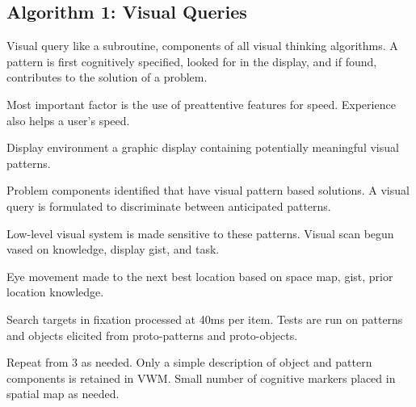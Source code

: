 \begin{mdframed}
\begin{multicols}{2}
\subsection{Algorithm 1: Visual Queries}
\begin{compactdesc}
\item[Visual query] like a subroutine, components of all visual thinking
    algorithms. A pattern is first cognitively specified, looked for in the
    display, and if found, contributes to the solution of a problem.
\item[Most important] factor is the use of preattentive features for speed.
    Experience also helps a user's speed.
\item[Display environment] a graphic display containing potentially meaningful
visual patterns.
\end{compactdesc}


\midrule\begin{compactenum}
\item Problem components identified that have visual pattern based solutions.
    A visual query is formulated to discriminate between anticipated patterns.
\item Low-level visual system is made sensitive to these patterns. Visual
    scan begun vased on knowledge, display gist, and task.
\item Eye movement made to the next best location based on space
    map, gist, prior location knowledge.
\item Search targets in fixation processed at 40ms per item. Tests are run on
    patterns and objects elicited from proto-patterns and proto-objects.
\item Repeat from 3 as needed. Only a simple description of object and
    pattern components is retained in VWM. Small number of cognitive markers
    placed in spatial map as needed.
\end{compactenum}
\end{multicols}\end{mdframed}





